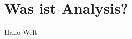 \documentclass[../ana2.tex]{subfiles}
\begin{document}
\setcounter{section}{0}
\section{Was ist Analysis?}

Hallo Welt
\end{document}
